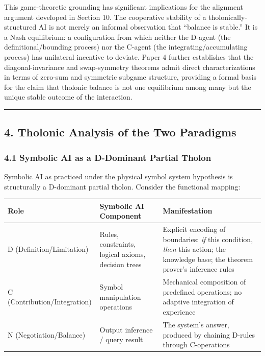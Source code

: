\documentclass[
  11pt,
  letterpaper,
]{article}
\begin{document}
This game-theoretic grounding has significant implications for the
alignment argument developed in Section 10. The cooperative stability of
a tholonically-structured AI is not merely an informal observation that
``balance is stable.'' It is a Nash equilibrium: a configuration from
which neither the D-agent (the definitional/bounding process) nor the
C-agent (the integrating/accumulating process) has unilateral incentive
to deviate. Paper 4 further establishes that the diagonal-invariance and
swap-symmetry theorems admit direct characterizations in terms of
zero-sum and symmetric subgame structure, providing a formal basis for
the claim that tholonic balance is not one equilibrium among many but
the unique stable outcome of the interaction.

\begin{center}\rule{0.5\linewidth}{0.5pt}\end{center}

\subsection{4. Tholonic Analysis of the Two
Paradigms}\label{tholonic-analysis-of-the-two-paradigms}

\subsubsection{4.1 Symbolic AI as a D-Dominant Partial
Tholon}\label{symbolic-ai-as-a-d-dominant-partial-tholon}

Symbolic AI as practiced under the physical symbol system hypothesis is
structurally a D-dominant partial tholon. Consider the functional
mapping:

\begin{longtable}[]{@{}
  >{\raggedright\arraybackslash}p{}
  >{\raggedright\arraybackslash}p{}
  >{\raggedright\arraybackslash}p{}@{}}
\toprule\noalign{}
\begin{minipage}[b]{\linewidth}\raggedright
Role
\end{minipage} & \begin{minipage}[b]{\linewidth}\raggedright
Symbolic AI Component
\end{minipage} & \begin{minipage}[b]{\linewidth}\raggedright
Manifestation
\end{minipage} \\
\midrule\noalign{}
\endhead
\bottomrule\noalign{}
\endlastfoot
D (Definition/Limitation) & Rules, constraints, logical axioms, decision
trees & Explicit encoding of boundaries: \emph{if} this condition,
\emph{then} this action; the knowledge base; the theorem prover's
inference rules \\
C (Contribution/Integration) & Symbol manipulation operations &
Mechanical composition of predefined operations; no adaptive integration
of experience \\
N (Negotiation/Balance) & Output inference / query result & The system's
answer, produced by chaining D-rules through C-operations \\
\end{longtable}
\end{document}
